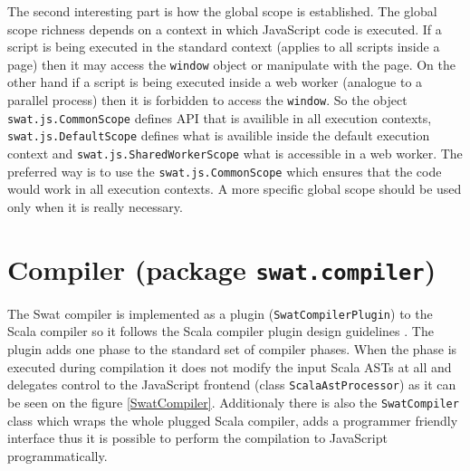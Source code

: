 \documentclass[12pt,a4paper]{report}
\begin{document}
The second interesting part is how the global scope is established. The global scope richness depends on a context in which JavaScript code is executed. If a script is being executed in the standard context (applies to all scripts inside a page) then it may access the \texttt{window} object or manipulate with the page. On the other hand if a script is being executed inside a web worker (analogue to a parallel process) then it is forbidden to access the \texttt{window}. So the object \texttt{swat.js.CommonScope} defines API that is availible in all execution contexts, \texttt{swat.js.DefaultScope} defines what is availible inside the default execution context and \texttt{swat.js.SharedWorkerScope} what is accessible in a web worker. The preferred way is to use the \texttt{swat.js.CommonScope} which ensures that the code would work in all execution contexts. A more specific global scope should be used only when it is really necessary.

\section{Compiler (package \texttt{swat.compiler})}

The Swat compiler is implemented as a plugin (\texttt{SwatCompilerPlugin}) to the Scala compiler so it follows the Scala compiler plugin design guidelines \cite{CompilerPlugins}. The plugin adds one phase to the standard set of compiler phases. When the phase is executed during compilation it does not modify the input Scala ASTs at all and delegates control to the JavaScript frontend (class \texttt{ScalaAstProcessor}) as it can be seen on the figure \ref{SwatCompiler}. Additionaly there is also the \texttt{SwatCompiler} class which wraps the whole plugged Scala compiler, adds a programmer friendly interface thus it is possible to perform the compilation to JavaScript programmatically.
\end{document}
